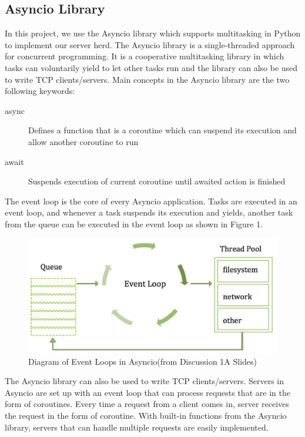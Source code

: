 \subsection{Asyncio Library}
In this project, we use the Asyncio library which supports multitasking in Python to implement our server herd. The Asyncio library is a single-threaded approach for concurrent programming. It is a cooperative multitasking library in which tasks can voluntarily yield to let other tasks run and the library can also be used to write TCP clients/servers. Main concepts in the Asyncio library are the two following keywords:
\begin{description}
\item[async] Defines a function that is a coroutine which can suspend its execution and allow another coroutine to run
\item[await] Suspends execution of current coroutine until awaited action is finished
\end{description}
The event loop is the core of every Asyncio application. Tasks are executed in an event loop, and whenever a task suspends its execution and yields, another task from the queue can be executed in the event loop as shown in Figure 1. \par
\begin{figure}
\includegraphics[scale=0.3]{eventloop.png}
\caption{\label{fig:vectors} Diagram of Event Loops in Asyncio(from Discussion 1A Slides)}
\end{figure}
The Asyncio library can also be used to write TCP clients/servers. Servers in Asyncio are set up with an event loop that can process requests that are in the form of coroutines. Every time a request from a client comes in, server receives the request in the form of coroutine. With built-in functions from the Asyncio library, servers that can handle multiple requests are easily implemented.



